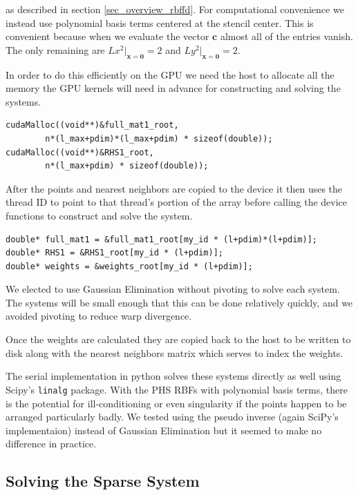 \documentclass[12pt]{article}
\let\vec\mathbf
\begin{document}
	\noindent as described in section \ref{sec_overview_rbffd}. For computational convenience we instead use polynomial basis terms centered at the stencil center. This is convenient because when we evaluate the vector $\vec{c}$ almost all of the entries vanish. The only remaining are $Lx^2\vert_{\vec{x}=\vec{0}} = 2$ and $Ly^2\vert_{\vec{x}=\vec{0}} = 2$.
	
	In order to do this efficiently on the GPU we need the host to allocate all the memory the GPU kernels will need in advance for constructing and solving the systems. 
	
	\begin{lstlisting}
cudaMalloc((void**)&full_mat1_root, 
		n*(l_max+pdim)*(l_max+pdim) * sizeof(double));
cudaMalloc((void**)&RHS1_root, 
		n*(l_max+pdim) * sizeof(double));
	\end{lstlisting}
	
	\noindent After the points and nearest neighbors are copied to the device it then uses the thread ID to point to that thread's portion of the array before calling the device functions to construct and solve the system.
	
	\begin{lstlisting}
double* full_mat1 = &full_mat1_root[my_id * (l+pdim)*(l+pdim)];
double* RHS1 = &RHS1_root[my_id * (l+pdim)];
double* weights = &weights_root[my_id * (l+pdim)];
	\end{lstlisting}
	
	We elected to use Gaussian Elimination without pivoting to solve each system. The systems will be small enough that this can be done relatively quickly, and we avoided pivoting to reduce warp divergence. 
	
	Once the weights are calculated they are copied back to the host to be written to disk along with the nearest neighbors matrix which serves to index the weights.
	
	The serial implementation in python solves these systems directly as well using Scipy's \texttt{linalg} package. With the PHS RBFs with polynomial basis terms, there is the potential for ill-conditioning or even singularity if the points happen to be arranged particularly badly. We tested using the pseudo inverse (again SciPy's implementaion) instead of Gaussian Elimination but it seemed to make no difference in practice.

\subsection{Solving the Sparse System}
\end{document}
